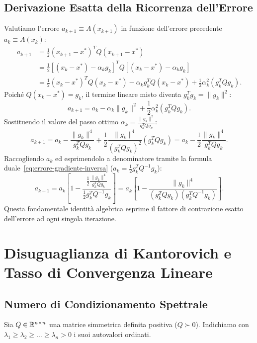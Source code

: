 \subsection{Derivazione Esatta della Ricorrenza dell'Errore}
Valutiamo l'errore $a_{k+1} \equiv A(x_{k+1})$ in funzione dell'errore precedente $a_k \equiv A(x_k)$:
\begin{align}
    a_{k+1} &= \frac{1}{2} (x_{k+1} - x^*)^T Q (x_{k+1} - x^*) \nonumber \\
            &= \frac{1}{2} [(x_k - x^*) - \alpha_k g_k]^T Q [(x_k - x^*) - \alpha_k g_k] \nonumber \\
            &= \frac{1}{2} (x_k - x^*)^T Q (x_k - x^*) - \alpha_k g_k^T Q (x_k - x^*) + \frac{1}{2} \alpha_k^2 (g_k^T Q g_k).
\end{align}
Poich\'e $Q(x_k - x^*) = g_k$, il termine lineare misto diventa $g_k^T g_k = \|g_k\|^2$:
\begin{equation}
    a_{k+1} = a_k - \alpha_k \|g_k\|^2 + \frac{1}{2} \alpha_k^2 (g_k^T Q g_k).
\end{equation}
Sostituendo il valore del passo ottimo $\alpha_k = \frac{\|g_k\|^2}{g_k^T Q g_k}$:
\begin{equation}
    a_{k+1} = a_k - \frac{\|g_k\|^4}{g_k^T Q g_k} + \frac{1}{2} \frac{\|g_k\|^4}{(g_k^T Q g_k)^2} (g_k^T Q g_k) = a_k - \frac{1}{2} \frac{\|g_k\|^4}{g_k^T Q g_k}.
\end{equation}
Raccogliendo $a_k$ ed esprimendolo a denominatore tramite la formula duale~\eqref{eq:errore-gradiente-inversa} ($a_k = \frac{1}{2} g_k^T Q^{-1} g_k$):
\begin{equation}
    a_{k+1} = a_k \left[ 1 - \frac{\frac{1}{2} \frac{\|g_k\|^4}{g_k^T Q g_k}}{\frac{1}{2} g_k^T Q^{-1} g_k} \right] = a_k \left[ 1 - \frac{\|g_k\|^4}{(g_k^T Q g_k)(g_k^T Q^{-1} g_k)} \right].
    \label{eq:ricorrenza-esatta-errore}
\end{equation}
Questa fondamentale identit\`a algebrica esprime il fattore di contrazione esatto dell'errore ad ogni singola iterazione.

\FloatBarrier
\section{Disuguaglianza di Kantorovich e Tasso di Convergenza Lineare}
\label{sec:kantorovich-tasso-lineare}

\subsection{Numero di Condizionamento Spettrale}
Sia $Q \in \mathbb{R}^{n \times n}$ una matrice simmetrica definita positiva ($Q \succ 0$). Indichiamo con $\lambda_1 \ge \lambda_2 \ge \dots \ge \lambda_n > 0$ i suoi autovalori ordinati.

